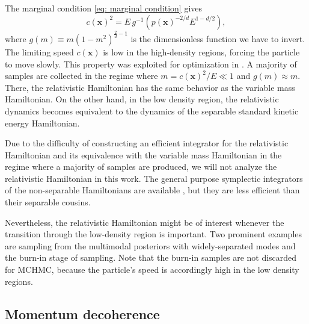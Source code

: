 \documentclass[twoside,11pt]{article}
\newcommand{\x}{\boldsymbol{x}}
\begin{document}
The marginal condition \eqref{eq: marginal condition} gives
\begin{equation}\label{eq: tuning2}
    c(\x)^2 = E \, g^{-1}\left( p(\x)^{-2/d} E^{1 - d/2} \right),
\end{equation}
where $g(m) \equiv m (1 - m^2)^{\frac{2}{d} -1}$ is the dimensionless function we have to invert. 
The limiting speed $c(\x)$ is low in the high-density regions, forcing the particle to move slowly. This property was exploited for optimization in \citet{BIoptimization}. 
A majority of samples are collected in the regime where $m = c(\x)^2 / E \ll 1$ and $g(m) \approx m$. There, the relativistic Hamiltonian has the same behavior as the variable mass Hamiltonian. On the other hand, in the low density region, the relativistic dynamics becomes equivalent to the dynamics of the separable standard kinetic energy Hamiltonian.

Due to the difficulty of constructing an efficient integrator for the relativistic Hamiltonian and its equivalence with the variable mass Hamiltonian in the regime where a majority of samples are produced, we will not analyze the relativistic Hamiltonian in this work. The general purpose symplectic integrators of the non-separable Hamiltonians are available \citep{SymmetricProjection}, but they are less efficient than their separable cousins.



Nevertheless, the relativistic Hamiltonian might be of interest whenever the transition through the low-density region is important. Two prominent examples are sampling from the multimodal posteriors with widely-separated modes and the burn-in stage of sampling. Note that the burn-in samples are not discarded for MCHMC, because the particle's speed is accordingly high in the low density regions.
 
\subsection{Momentum decoherence} \label{sec: decoherence}
\end{document}
